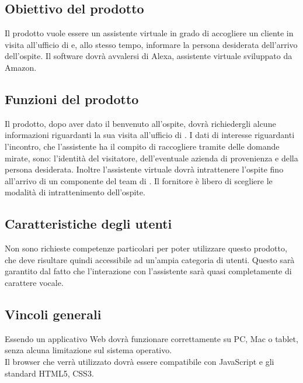 \subsection{Obiettivo del prodotto}
Il prodotto vuole essere un assistente virtuale in grado di accogliere un cliente in visita all'ufficio di \PROPONENTE{} e, allo stesso tempo, informare la persona desiderata dell'arrivo dell'ospite. Il software dovrà avvalersi di Alexa, assistente virtuale sviluppato da Amazon.
\subsection{Funzioni del prodotto}
Il prodotto, dopo aver dato il benvenuto all'ospite, dovrà richiedergli alcune informazioni riguardanti la sua visita all'ufficio di \PROPONENTE. 
I dati di interesse riguardanti l'incontro, che l'assistente ha il compito di raccogliere tramite delle domande mirate, sono: l'identità del visitatore, dell'eventuale azienda di provenienza e della persona desiderata. Inoltre l'assistente virtuale dovrà intrattenere l'ospite fino all'arrivo di un componente del team di \PROPONENTE{}. Il fornitore è libero di scegliere le modalità di intrattenimento dell'ospite.  
\subsection{Caratteristiche degli utenti}
Non sono richieste competenze particolari per poter utilizzare questo prodotto, che deve risultare
quindi accessibile ad un'ampia categoria di utenti. Questo sarà garantito dal fatto che l'interazione con l'assistente sarà quasi completamente di carattere vocale.
\subsection{Vincoli generali}
Essendo un applicativo Web dovrà funzionare correttamente su PC, Mac o tablet, senza alcuna limitazione sul sistema operativo.\\
Il browser che verrà utilizzato dovrà essere compatibile con JavaScript e gli standard HTML5, CSS3.